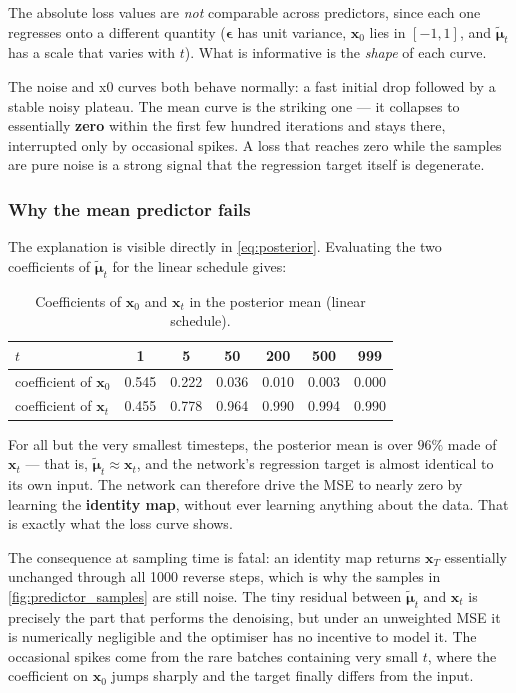 \documentclass[a4paper]{article} %
\begin{document}
The absolute loss values are \emph{not} comparable across predictors, since each one regresses onto
a different quantity ($\boldsymbol{\epsilon}$ has unit variance, $\mathbf{x}_0$ lies in $[-1,1]$,
and $\tilde{\boldsymbol{\mu}}_t$ has a scale that varies with $t$). What is informative is the
\emph{shape} of each curve.

The noise and x0 curves both behave normally: a fast initial drop followed by a stable noisy
plateau. The mean curve is the striking one --- it collapses to essentially \textbf{zero} within the
first few hundred iterations and stays there, interrupted only by occasional spikes. A loss that
reaches zero while the samples are pure noise is a strong signal that the regression target itself
is degenerate.

\subsubsection{Why the mean predictor fails}

The explanation is visible directly in \autoref{eq:posterior}. Evaluating the two coefficients of
$\tilde{\boldsymbol{\mu}}_t$ for the linear schedule gives:

\begin{table}[H]
\centering
\caption{Coefficients of $\mathbf{x}_0$ and $\mathbf{x}_t$ in the posterior mean (linear schedule).}
\label{tab:mean_coef}
\begin{tabular}{lcccccc}
\toprule
$t$ & 1 & 5 & 50 & 200 & 500 & 999 \\
\midrule
coefficient of $\mathbf{x}_0$ & 0.545 & 0.222 & 0.036 & 0.010 & 0.003 & 0.000 \\
coefficient of $\mathbf{x}_t$ & 0.455 & 0.778 & 0.964 & 0.990 & 0.994 & 0.990 \\
\bottomrule
\end{tabular}
\end{table}

For all but the very smallest timesteps, the posterior mean is over $96\%$ made of $\mathbf{x}_t$
--- that is, $\tilde{\boldsymbol{\mu}}_t \approx \mathbf{x}_t$, and the network's regression target
is almost identical to its own input. The network can therefore drive the MSE to nearly zero by
learning the \textbf{identity map}, without ever learning anything about the data. That is exactly
what the loss curve shows.

The consequence at sampling time is fatal: an identity map returns $\mathbf{x}_T$ essentially
unchanged through all 1000 reverse steps, which is why the samples in
\autoref{fig:predictor_samples} are still noise. The tiny residual between
$\tilde{\boldsymbol{\mu}}_t$ and $\mathbf{x}_t$ is precisely the part that performs the denoising,
but under an unweighted MSE it is numerically negligible and the optimiser has no incentive to
model it. The occasional spikes come from the rare batches containing very small $t$, where the
coefficient on $\mathbf{x}_0$ jumps sharply and the target finally differs from the input.
\end{document}
